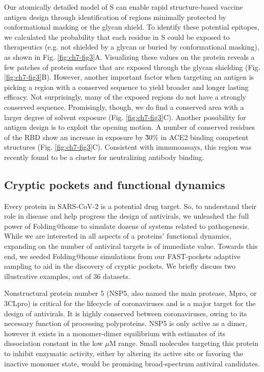 \documentclass[../main.tex]{subfiles}
\begin{document}
        Our atomically detailed model of S can enable rapid structure-based vaccine antigen design through identification of regions minimally protected by conformational masking or the glycan shield\cite{graham_structure-based_2019}. To identify these potential epitopes, we calculated the probability that each residue in S could be exposed to therapeutics (e.g. not shielded by a glycan or buried by conformational masking), as shown in Fig. \ref{fig:ch7-fig3}A. Visualizing these values on the protein reveals a few patches of protein surface that are exposed through the glycan shielding (Fig. \ref{fig:ch7-fig3}B). However, another important factor when targeting an antigen is picking a region with a conserved sequence to yield broader and longer lasting efficacy. Not surprisingly, many of the exposed regions do not have a strongly conserved sequence. Promisingly, though, we do find a conserved area with a larger degree of solvent exposure (Fig. \ref{fig:ch7-fig3}C). Another possibility for antigen design is to exploit the opening motion. A number of conserved residues of the RBD show an increase in exposure by \~30\% in ACE2 binding competent structures (Fig. \ref{fig:ch7-fig3}C). Consistent with immunoassays, this region was recently found to be a cluster for neutralizing antibody binding\cite{huo_neutralization_2020,zhong_epidemiology_2003}.


    \subsection{Cryptic pockets and functional dynamics}
        Every protein in SARS-CoV-2 is a potential drug target. So, to understand their role in disease and help progress the design of antivirals, we unleashed the full power of Folding@home to simulate dozens of systems related to pathogenesis. While we are interested in all aspects of a proteins’ functional dynamics, expanding on the number of antiviral targets is of immediate value. Towards this end, we seeded Folding@home simulations from our FAST-pockets adaptive sampling to aid in the discovery of cryptic pockets. We briefly discuss two illustrative examples, out of 36 datasets.
        
        Nonstructural protein number 5 (NSP5, also named the main protease, Mpro, or 3CLpro) is critical for the lifecycle of coronaviruses and is a major target for the design of antivirals\cite{zhang_crystal_2020}. It is highly conserved between coronaviruses, owing to its necessary function of processing polyproteins. NSP5 is only active as a dimer, however it exists in a monomer-dimer equilibrium with estimates of its dissociation constant in the low $\mu$M range\cite{graziano_sars_2006}. Small molecules targeting this protein to inhibit enzymatic activity, either by altering its active site or favoring the inactive monomer state, would be promising broad-spectrum antiviral candidates\cite{goyal_targeting_2020}.
\end{document}
